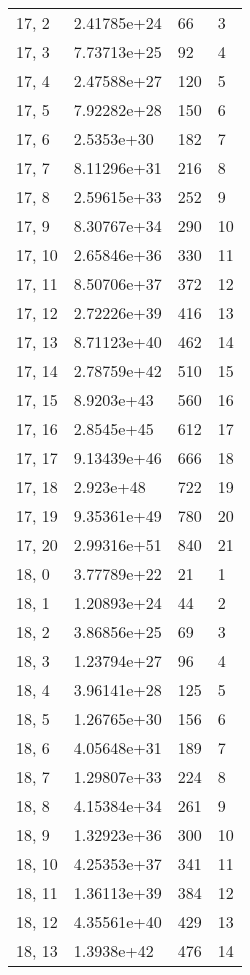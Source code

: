 \begin{table}
\begin{tabular}{llll}
17, 2  &  2.41785e+24 &   66 &     3 \\
17, 3  &  7.73713e+25 &   92 &     4 \\
17, 4  &  2.47588e+27 &  120 &     5 \\
17, 5  &  7.92282e+28 &  150 &     6 \\
17, 6  &   2.5353e+30 &  182 &     7 \\
17, 7  &  8.11296e+31 &  216 &     8 \\
17, 8  &  2.59615e+33 &  252 &     9 \\
17, 9  &  8.30767e+34 &  290 &    10 \\
17, 10 &  2.65846e+36 &  330 &    11 \\
17, 11 &  8.50706e+37 &  372 &    12 \\
17, 12 &  2.72226e+39 &  416 &    13 \\
17, 13 &  8.71123e+40 &  462 &    14 \\
17, 14 &  2.78759e+42 &  510 &    15 \\
17, 15 &   8.9203e+43 &  560 &    16 \\
17, 16 &   2.8545e+45 &  612 &    17 \\
17, 17 &  9.13439e+46 &  666 &    18 \\
17, 18 &    2.923e+48 &  722 &    19 \\
17, 19 &  9.35361e+49 &  780 &    20 \\
17, 20 &  2.99316e+51 &  840 &    21 \\
18, 0  &  3.77789e+22 &   21 &     1 \\
18, 1  &  1.20893e+24 &   44 &     2 \\
18, 2  &  3.86856e+25 &   69 &     3 \\
18, 3  &  1.23794e+27 &   96 &     4 \\
18, 4  &  3.96141e+28 &  125 &     5 \\
18, 5  &  1.26765e+30 &  156 &     6 \\
18, 6  &  4.05648e+31 &  189 &     7 \\
18, 7  &  1.29807e+33 &  224 &     8 \\
18, 8  &  4.15384e+34 &  261 &     9 \\
18, 9  &  1.32923e+36 &  300 &    10 \\
18, 10 &  4.25353e+37 &  341 &    11 \\
18, 11 &  1.36113e+39 &  384 &    12 \\
18, 12 &  4.35561e+40 &  429 &    13 \\
18, 13 &   1.3938e+42 &  476 &    14 \\

\end{tabular}
\end{table}
